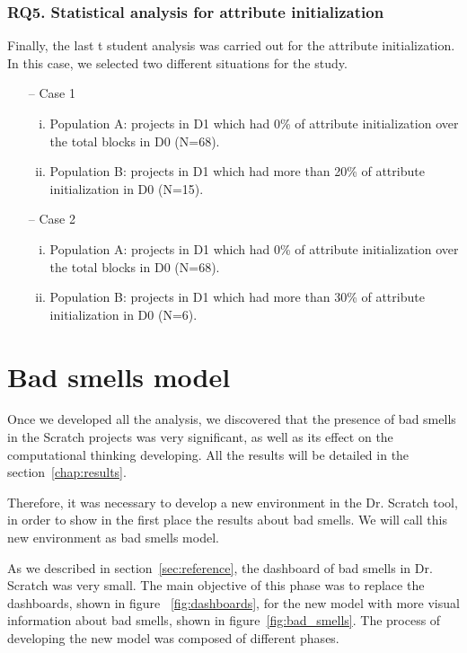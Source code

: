 \subsubsection{RQ5. Statistical analysis for attribute initialization}
\label{subsubsec:RQ5_statistical}

Finally, the last t student analysis was carried out for the attribute initialization. In this case, we selected two different situations for the study. 

\begin{itemize}
    \item[--] Case 1
    \begin{enumerate}[(i)]
        \item Population A: projects in D1 which had 0\% of attribute initialization over the total blocks in D0 (N=68).
        \item Population B: projects in D1 which had more than 20\% of attribute initialization in D0 (N=15).
    \end{enumerate}
    \item[--] Case 2
    \begin{enumerate}[(i)]
        \item Population A: projects in D1 which had 0\% of attribute initialization over the total blocks in D0 (N=68).
        \item Population B: projects in D1 which had more than 30\% of attribute initialization in D0 (N=6).
    \end{enumerate}
\end{itemize}


\section{Bad smells model}
\label{sec:badsmells}

Once we developed all the analysis, we discovered that the presence of bad smells in the Scratch projects was very significant, as well as its effect on the computational thinking developing. All the results will be detailed in the section~\ref{chap:results}. 

Therefore, it was necessary to develop a new environment in the Dr. Scratch tool, in order to show in the first place the results about bad smells. We will call this new environment as bad smells model. 

As we described in section~\ref{sec:reference}, the dashboard of bad smells in Dr. Scratch was very small. The main objective of this phase was to replace the dashboards, shown in figure ~\ref{fig:dashboards}, for the new model with more visual information about bad smells, shown in figure~\ref{fig:bad_smells}. The process of developing the new model was composed of different phases.

